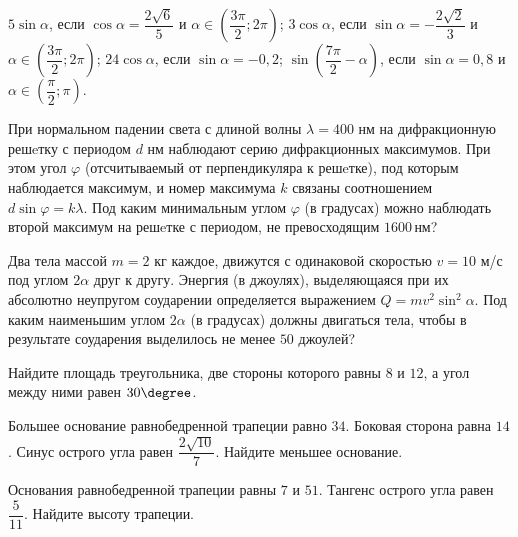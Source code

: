 \begin{class}[number=2]
\begin{listofex}
\begin{tasks}
			\task \( 5\sin\alpha \), если \( \cos\alpha=\dfrac{2\sqrt{6}}{5} \) и \( \alpha\in\left( \dfrac{3\pi}{2}; 2\pi \right) \);
			\task \( 3\cos\alpha \), если \( \sin\alpha=-\dfrac{2\sqrt{2}}{3} \) и \( \alpha\in\left( \dfrac{3\pi}{2}; 2\pi \right) \);
			\task \( 24\cos\alpha \), если \( \sin\alpha=-0,2 \);
			\task \( \sin\left( \dfrac{7\pi}{2}-\alpha \right) \), если \( \sin\alpha=0,8 \) и \( \alpha\in\left( \dfrac{\pi}{2}; \pi \right) \).
		\end{tasks}
		\item При нормальном падении света с длиной волны \( \lambda=400 \) нм на дифракционную решeтку с периодом \(d\) нм наблюдают серию дифракционных максимумов. При этом угол \(\varphi\)  (отсчитываемый от перпендикуляра к решeтке), под которым наблюдается максимум, и номер максимума \(k\) связаны соотношением \(d \sin \varphi= k\lambda\). Под каким минимальным углом \(\varphi\) (в градусах) можно наблюдать второй максимум на решeтке с периодом, не превосходящим \(1600\) нм?
		\item Два тела массой \(m=2\) кг каждое, движутся с одинаковой скоростью  \(v =10\) м/с под углом \(2\alpha\) друг к другу. Энергия (в джоулях), выделяющаяся при их абсолютно неупругом соударении определяется выражением \(Q= m v^2 \sin^2 \alpha \). Под каким наименьшим углом \(2\alpha\) (в градусах) должны двигаться тела, чтобы в результате соударения выделилось не менее \(50\) джоулей?
		\item Найдите площадь треугольника, две стороны которого равны \(8\) и \(12\), а угол между ними равен \(30 \degree\).
		\item Большее основание равнобедренной трапеции равно \(34\). Боковая сторона равна \(14\). Синус острого угла равен \( \dfrac{ 2\sqrt{10}}{ 7 } \). Найдите меньшее основание.
		\item Основания равнобедренной трапеции равны \(7\) и \(51\). Тангенс острого угла равен \( \dfrac{ 5 }{ 11 } \).  Найдите высоту трапеции.
		
	\end{listofex}
\end{class}


